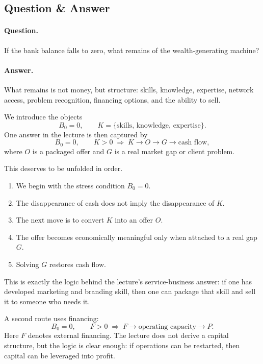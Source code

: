 \subsection{Question \& Answer}

\paragraph{Question.}
If the bank balance falls to zero, what remains of the wealth-generating machine?

\paragraph{Answer.}
What remains is not money, but structure: skills, knowledge, expertise, network access, problem recognition, financing options, and the ability to sell.

We introduce the objects
\begin{equation}
B_0 = 0,
\qquad
K=\{\text{skills},\,\text{knowledge},\,\text{expertise}\}.
\end{equation}
One answer in the lecture is then captured by
\begin{equation}
B_0=0,\qquad K>0
\;\Longrightarrow\;
K \longrightarrow O \longrightarrow G \longrightarrow \text{cash flow},
\end{equation}
where \(O\) is a packaged offer and \(G\) is a real market gap or client problem.

This deserves to be unfolded in order.

\begin{enumerate}
\item We begin with the stress condition \(B_0=0\).
\item The disappearance of cash does not imply the disappearance of \(K\).
\item The next move is to convert \(K\) into an offer \(O\).
\item The offer becomes economically meaningful only when attached to a real gap \(G\).
\item Solving \(G\) restores cash flow.
\end{enumerate}

This is exactly the logic behind the lecture's service-business answer: if one has developed marketing and branding skill, then one can package that skill and sell it to someone who needs it.

A second route uses financing:
\begin{equation}
B_0=0,\qquad F>0
\;\Longrightarrow\;
F \longrightarrow \text{operating capacity} \longrightarrow P.
\end{equation}
Here \(F\) denotes external financing. The lecture does not derive a capital structure, but the logic is clear enough: if operations can be restarted, then capital can be leveraged into profit.

